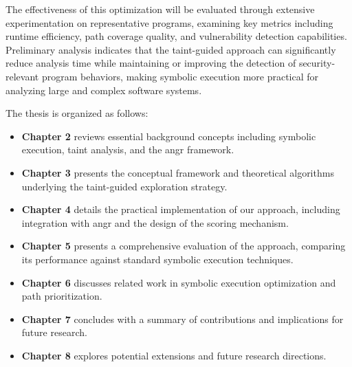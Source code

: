 
The effectiveness of this optimization will be evaluated through extensive experimentation on representative programs, examining key metrics including runtime efficiency, path coverage quality, and vulnerability detection capabilities. Preliminary analysis indicates that the taint-guided approach can significantly reduce analysis time while maintaining or improving the detection of security-relevant program behaviors, making symbolic execution more practical for analyzing large and complex software systems.

The thesis is organized as follows:

\begin{itemize}
    \item \textbf{Chapter 2} reviews essential background concepts including symbolic execution, taint analysis, and the angr framework.
    \item \textbf{Chapter 3} presents the conceptual framework and theoretical algorithms underlying the taint-guided exploration strategy.
    \item \textbf{Chapter 4} details the practical implementation of our approach, including integration with angr and the design of the scoring mechanism.
    \item \textbf{Chapter 5} presents a comprehensive evaluation of the approach, comparing its performance against standard symbolic execution techniques.
    \item \textbf{Chapter 6} discusses related work in symbolic execution optimization and path prioritization.
    \item \textbf{Chapter 7} concludes with a summary of contributions and implications for future research.
    \item \textbf{Chapter 8} explores potential extensions and future research directions.
\end{itemize}
